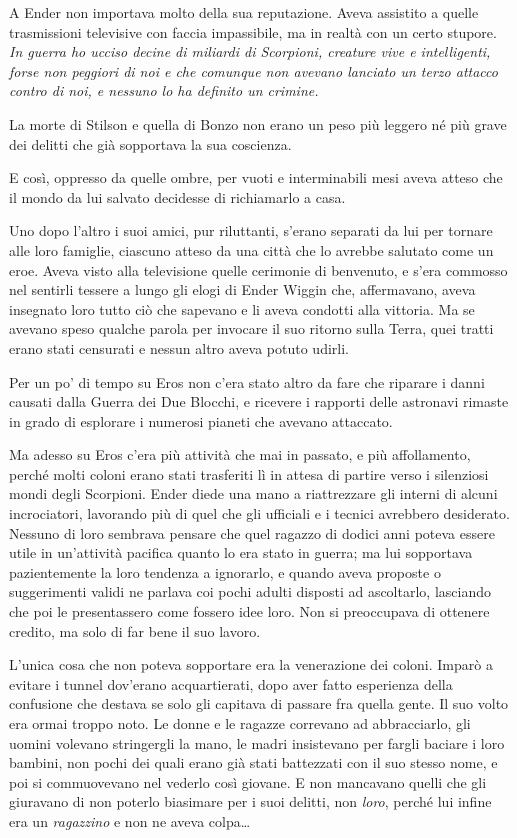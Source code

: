 {A Ender non importava molto della sua reputazione. Aveva assistito a
	quelle trasmissioni televisive con faccia impassibile, ma in realtà con
	un certo stupore. \emph{In guerra ho ucciso decine di miliardi di
		Scorpioni, creature vive e intelligenti, forse non peggiori di noi e che
		comunque non avevano lanciato un terzo attacco contro di noi, e nessuno
		lo ha definito un crimine.}}

{La morte di Stilson e quella di Bonzo non erano un peso più leggero né
	più grave dei delitti che già sopportava la sua coscienza.}

{E così, oppresso da quelle ombre, per vuoti e interminabili mesi aveva
	atteso che il mondo da lui salvato decidesse di richiamarlo a casa.}

{Uno dopo l'altro i suoi amici, pur riluttanti, s'erano separati da lui
	per tornare alle loro famiglie, ciascuno atteso da una città che lo
	avrebbe salutato come un eroe. Aveva visto alla televisione quelle
	cerimonie di benvenuto, e s'era commosso nel sentirli tessere a lungo
	gli elogi di Ender Wiggin che, affermavano, aveva insegnato loro tutto
	ciò che sapevano e li aveva condotti alla vittoria. Ma se avevano speso
	qualche parola per invocare il suo ritorno sulla Terra, quei tratti
	erano stati censurati e nessun altro aveva potuto udirli.}

{Per un po' di tempo su Eros non c'era stato altro da fare che riparare
	i danni causati dalla Guerra dei Due Blocchi, e ricevere i rapporti
	delle astronavi rimaste in grado di esplorare i numerosi pianeti che
	avevano attaccato.}

{Ma adesso su Eros c'era più attività che mai in passato, e più
	affollamento, perché molti coloni erano stati trasferiti lì in attesa di
	partire verso i silenziosi mondi degli Scorpioni. Ender diede una mano a
	riattrezzare gli interni di alcuni incrociatori, lavorando più di quel
	che gli ufficiali e i tecnici avrebbero desiderato. Nessuno di loro
	sembrava pensare che quel ragazzo di dodici anni poteva essere utile in
	un'attività pacifica quanto lo era stato in guerra; ma lui sopportava
	pazientemente la loro tendenza a ignorarlo, e quando aveva proposte o
	suggerimenti validi ne parlava coi pochi adulti disposti ad ascoltarlo,
	lasciando che poi le presentassero come fossero idee loro. Non si
	preoccupava di ottenere credito, ma solo di far bene il suo lavoro.}

{L'unica cosa che non poteva sopportare era la venerazione dei coloni.
	Imparò a evitare i tunnel dov'erano acquartierati, dopo aver fatto
	esperienza della confusione che destava se solo gli capitava di passare
	fra quella gente. Il suo volto era ormai troppo noto. Le donne e le
	ragazze correvano ad abbracciarlo, gli uomini volevano stringergli la
	mano, le madri insistevano per fargli baciare i loro bambini, non pochi
	dei quali erano già stati battezzati con il suo stesso nome, e poi si
	commuovevano nel vederlo così giovane. E non mancavano quelli che gli
	giuravano di non poterlo biasimare per i suoi delitti, non \emph{loro},
	\emph{} perché lui infine era un \emph{ragazzino} e non ne aveva
	colpa\ldots{}}

